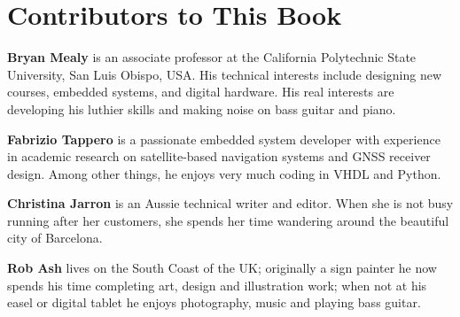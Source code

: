 %
%
%
\chapter{Contributors to This Book}

\noindent
\textbf{Bryan Mealy} is an associate professor at the California Polytechnic State University, San Luis Obispo, USA. His technical interests include designing new courses, embedded systems, and digital hardware. His real interests are developing his luthier skills and making noise on bass guitar and piano.

\noindent
\textbf{Fabrizio Tappero} is a passionate embedded system developer with experience in academic research on satellite-based navigation systems and GNSS receiver design. Among other things, he enjoys very much coding in VHDL and Python.

\noindent
\textbf{Christina Jarron} is an Aussie technical writer and editor. When she is not busy running after her customers, she spends her time wandering around the beautiful city of Barcelona. 

\noindent
\textbf{Rob Ash} lives on the South Coast of the UK; originally a sign painter he now spends his time completing art, design and illustration work; when not at his easel or digital tablet he enjoys photography, music and playing bass guitar.

